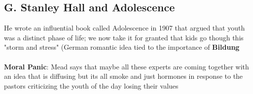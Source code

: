 \documentclass{article}
\begin{document}
\begin{itemize}
\subsection{G. Stanley Hall and Adolescence}
He wrote an influential book called Adolescence in 1907 that argued that youth was a distinct phase of life; we now take it for granted that kids go though this "storm and stress" (German romantic idea tied to the importance of \textbf{Bildung} \\ \\ 
\textbf{Moral Panic}: Mead says that maybe all these experts are coming together with an idea that is diffusing but its all smoke and just hormones in response to the pastors criticizing the youth of the day losing their values

\end{itemize}
\end{document}
